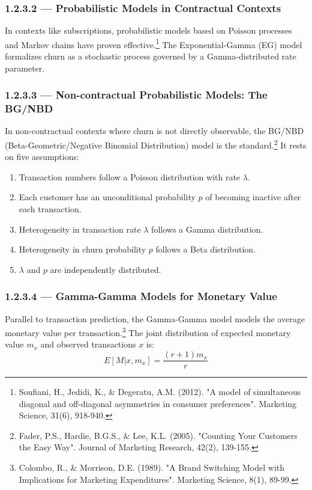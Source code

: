 \documentclass[12pt,a4paper,oneside]{report}
\begin{document}
\subsubsection{1.2.3.2 — Probabilistic Models in Contractual Contexts}

In contexts like subscriptions, probabilistic models based on Poisson processes and Markov chains have proven effective.\footnote{Soufiani, H., Jedidi, K., \& Degeratu, A.M. (2012). "A model of simultaneous diagonal and off-diagonal asymmetries in consumer preferences". Marketing Science, 31(6), 918-940.} The Exponential-Gamma (EG) model formalizes churn as a stochastic process governed by a Gamma-distributed rate parameter.

\subsubsection{1.2.3.3 — Non-contractual Probabilistic Models: The BG/NBD}

In non-contractual contexts where churn is not directly observable, the BG/NBD (Beta-Geometric/Negative Binomial Distribution) model is the standard.\footnote{Fader, P.S., Hardie, B.G.S., \& Lee, K.L. (2005). "Counting Your Customers the Easy Way". Journal of Marketing Research, 42(2), 139-155.} It rests on five assumptions:
\begin{enumerate}
\item Transaction numbers follow a Poisson distribution with rate $\lambda$.
\item Each customer has an unconditional probability $p$ of becoming inactive after each transaction.
\item Heterogeneity in transaction rate $\lambda$ follows a Gamma distribution.
\item Heterogeneity in churn probability $p$ follows a Beta distribution.
\item $\lambda$ and $p$ are independently distributed.
\end{enumerate}

\subsubsection{1.2.3.4 — Gamma-Gamma Models for Monetary Value}

Parallel to transaction prediction, the Gamma-Gamma model models the average monetary value per transaction.\footnote{Colombo, R., \& Morrison, D.E. (1989). "A Brand Switching Model with Implications for Marketing Expenditures". Marketing Science, 8(1), 89-99.} The joint distribution of expected monetary value $m_x$ and observed transactions $x$ is:
\begin{equation}
E[M|x, m_x] = \frac{(r+1)m_x}{r}
\label{eq:gamma_gamma}
\end{equation}
\end{document}
